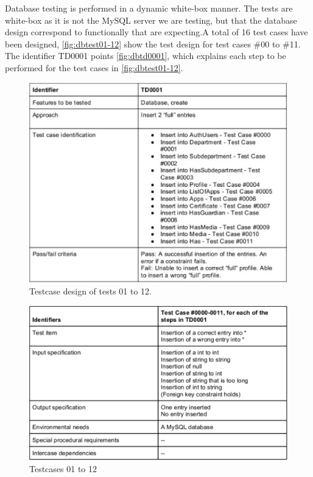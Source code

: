 Database testing is performed in a dynamic white-box manner. The tests are white-box as it is not the MySQL server we are testing, but that the database design
correspond to functionally that are expecting.A total of 16 test cases have been designed, \autoref{fig:dbtest01-12} show the test design for test cases \#00 to \#11.
The identifier TD0001 points \autoref{fig:dbtd0001}, which explains each step to be performed for the test cases in \autoref{fig:dbtest01-12}.


\begin{figure}[H]
 \includegraphics[scale=1.00]{images/dbtesttd0001}
 \caption{Testcase design of tests 01 to 12.}
  \label{fig:dbtest01-12}
\end{figure}

\begin{figure}[H]
 \includegraphics[scale=1.00]{images/dbtestcase01-12}
  \caption{Testcases 01 to 12}
  \label{fig:dbtd0001}
\end{figure}


